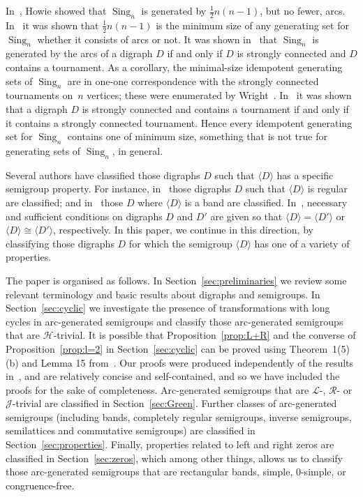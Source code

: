 \documentclass[ALCO,ThmDefs,Unicode,epreuves]{cedram}
\DeclareMathOperator{\Sing}{Sing}
\newcommand{\genset}[1]{\langle#1\rangle}
\newcommand{\LL}{\mathcal{L}}
\newcommand{\R}{\mathcal{R}}
\newcommand{\J}{\mathcal{J}}
\newcommand{\Hcal}{\mathcal{H}}
\begin{document}
In~\cite{Howie1978aa}, Howie showed that $\Sing_n$ is generated by $\frac{1}{2}n(n-1)$,
but no fewer, arcs. In~\cite{Gomes1987aa} it was shown that $\frac{1}{2}n(n-1)$ is
the minimum size of any generating set for $\Sing_n$ whether it consists of
arcs or not. It was shown in~\cite{Howie1978aa} that $\Sing_n$ is generated by the
arcs of a digraph $D$ if and only if $D$ is strongly connected and $D$ contains
a tournament. As a corollary, the minimal-size idempotent generating sets of
$\Sing_n$ are in one-one correspondence with the strongly connected tournaments
on~$n$ vertices; these were enumerated by Wright~\cite{Wright1970aa}. In~\cite{Dolinka2016aa} it
was shown that a digraph $D$ is strongly connected and contains a tournament if
and only if it contains a strongly connected tournament. Hence every
idempotent generating set for $\Sing_n$ contains one of minimum size, something
that is not true for generating sets of $\Sing_n$, in general. 

Several authors have classified those digraphs $D$ such that $\genset{D}$ has a
specific semigroup property. For instance, in~\cite{Yang2005aa} those digraphs $D$
such that $\genset{D}$ is regular are classified; and in~\cite{Cameron2016aa}
those $D$ where $\genset{D}$ is a band are classified. In~\cite{Yang2005aa, Yang2009aa},
necessary and sufficient conditions on digraphs $D$ and $D'$ are given so that
$\genset{D} = \genset{D'}$ or $\genset{D}\cong\genset{D'}$, respectively. In
this paper, we continue in this direction, by classifying those digraphs $D$
for which the semigroup $\genset{D}$ has one of a variety of properties.

The paper is organised as follows. In Section~\ref{sec:preliminaries} we review
some relevant terminology and basic results about digraphs and semigroups. In
Section~\ref{sec:cyclic} we investigate the presence of transformations with
long cycles in arc-generated semigroups and classify those arc-generated
semigroups that are $\Hcal$-trivial. It is possible that
Proposition~\ref{prop:L+R} and the converse of Proposition~\ref{prop:l=2} in
Section~\ref{sec:cyclic} can be proved using Theorem~1(5)(b) and Lemma 15
from~\cite{Horvath2017aa}. Our proofs were produced independently of the results
in~\cite{Horvath2017aa}, and are relatively concise and self-contained, and so we have
included the proofs for the sake of completeness. Arc-generated semigroups
that are $\LL$-, $\R$- or $\J$-trivial are classified in
Section~\ref{sec:Green}. Further classes of arc-generated
semigroups (including bands, completely regular semigroups, inverse
semigroups, semilattices and commutative semigroups) are classified in
Section~\ref{sec:properties}. Finally, properties related to left and right
zeros are classified in Section~\ref{sec:zeros}, which among other things,
allows us to classify those arc-generated semigroups that are rectangular
bands, simple, $0$-simple, or congruence-free.
\end{document}
